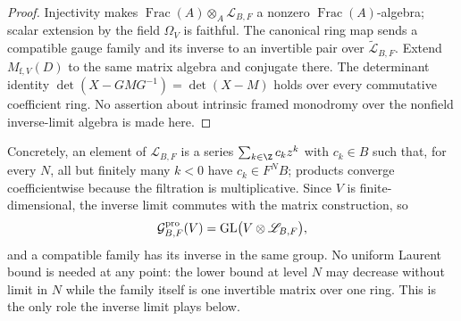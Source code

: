 \begin{proof}
Injectivity makes
\(\operatorname{Frac}(A)\otimes_A\mathscr L_{B,F}\) a nonzero
\(\operatorname{Frac}(A)\)-algebra; scalar extension by the field
\(\Omega_V\) is faithful.  The canonical ring map sends a compatible gauge
family and its inverse to an invertible pair over
\(\widetilde{\mathscr L}_{B,F}\).  Extend
\(M_{\mathrm f,V}(D)\) to the same matrix algebra and conjugate there.
The determinant identity
\(\det(X-GMG^{-1})=\det(X-M)\) holds over every commutative coefficient
ring.  No assertion about intrinsic framed monodromy over the nonfield
inverse-limit algebra is made here.
\end{proof}

\begin{remark}
\label{rem:pro-laurent-concrete}
Concretely, an element of \(\mathscr L_{B,F}\) is a series
\(\sum_{k\in\Z}c_kz^k\) with \(c_k\in B\) such that, for every \(N\), all but
finitely many \(k<0\) have \(c_k\in F^NB\); products converge coefficientwise
because the filtration is multiplicative.  Since \(V\) is finite-dimensional,
the inverse limit commutes with the matrix construction, so
\[
 \mathcal G^{\rm pro}_{B,F}(V)
 =\operatorname{GL}\bigl(V\otimes\mathscr L_{B,F}\bigr),
\]
and a compatible family has its inverse in the same group.  No uniform Laurent
bound is needed at any point: the lower bound at level \(N\) may decrease
without limit in \(N\) while the family itself is one invertible matrix over
one ring.  This is the only role the inverse limit plays below.
\end{remark}

